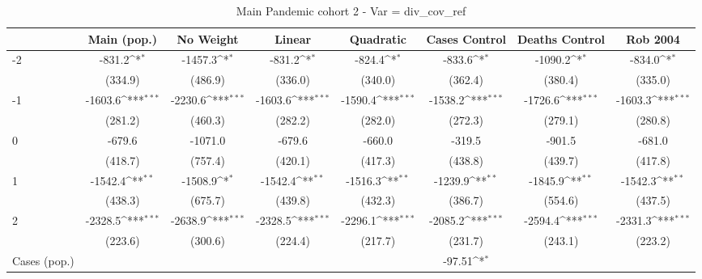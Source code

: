 \documentclass{article}
\begin{document}
{
\def\sym#1{\ifmmode^{#1}\else\(^{#1}\)\fi}
\begin{longtable}{l*{7}{c}}
\caption{Main Pandemic cohort 2 - Var = div\_cov\_ref}\\
\hline\hline\endfirsthead\hline\endhead\hline\endfoot\endlastfoot
                &\multicolumn{1}{c}{Main (pop.)}&\multicolumn{1}{c}{No Weight}&\multicolumn{1}{c}{Linear}&\multicolumn{1}{c}{Quadratic}&\multicolumn{1}{c}{Cases Control}&\multicolumn{1}{c}{Deaths Control}&\multicolumn{1}{c}{Rob 2004}\\
\hline
-2              &   -831.2\sym{*}  &  -1457.3\sym{*}  &   -831.2\sym{*}  &   -824.4\sym{*}  &   -833.6\sym{*}  &  -1090.2\sym{*}  &   -834.0\sym{*}  \\
                &  (334.9)         &  (486.9)         &  (336.0)         &  (340.0)         &  (362.4)         &  (380.4)         &  (335.0)         \\
-1              &  -1603.6\sym{***}&  -2230.6\sym{***}&  -1603.6\sym{***}&  -1590.4\sym{***}&  -1538.2\sym{***}&  -1726.6\sym{***}&  -1603.3\sym{***}\\
                &  (281.2)         &  (460.3)         &  (282.2)         &  (282.0)         &  (272.3)         &  (279.1)         &  (280.8)         \\
0               &   -679.6         &  -1071.0         &   -679.6         &   -660.0         &   -319.5         &   -901.5         &   -681.0         \\
                &  (418.7)         &  (757.4)         &  (420.1)         &  (417.3)         &  (438.8)         &  (439.7)         &  (417.8)         \\
1               &  -1542.4\sym{**} &  -1508.9\sym{*}  &  -1542.4\sym{**} &  -1516.3\sym{**} &  -1239.9\sym{**} &  -1845.9\sym{**} &  -1542.3\sym{**} \\
                &  (438.3)         &  (675.7)         &  (439.8)         &  (432.3)         &  (386.7)         &  (554.6)         &  (437.5)         \\
2               &  -2328.5\sym{***}&  -2638.9\sym{***}&  -2328.5\sym{***}&  -2296.1\sym{***}&  -2085.2\sym{***}&  -2594.4\sym{***}&  -2331.3\sym{***}\\
                &  (223.6)         &  (300.6)         &  (224.4)         &  (217.7)         &  (231.7)         &  (243.1)         &  (223.2)         \\
Cases (pop.)    &                  &                  &                  &                  &   -97.51\sym{*}  &                  &                  \\

\end{longtable}}
\end{document}
